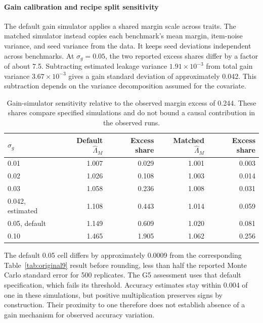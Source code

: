 \paragraph{Gain calibration and recipe split sensitivity}
The default gain simulator applies a shared margin scale across traits. The matched simulator instead copies each benchmark's mean margin, item-noise variance, and seed variance from the data. It keeps seed deviations independent across benchmarks. At $\sigma_g=0.05$, the two reported excess shares differ by a factor of about 7.5. Subtracting estimated leakage variance $1.91\times10^{-3}$ from total gain variance $3.67\times10^{-3}$ gives a gain standard deviation of approximately 0.042. This subtraction depends on the variance decomposition assumed for the covariate.

\begin{table}[!htb]
\centering
\caption{Gain-simulator sensitivity relative to the observed margin excess of 0.244. These shares compare specified simulations and do not bound a causal contribution in the observed runs.}
\label{tab:original13}
\small\setlength{\tabcolsep}{4pt}\renewcommand{\arraystretch}{1.12}
\begin{tabular}{lrrrr}\toprule
$\sigma_g$ & Default $\widehat\Lambda_M$ & Excess share & Matched $\widehat\Lambda_M$ & Excess share\\\midrule
0.01 & 1.007 & 0.029 & 1.001 & 0.003\\
0.02 & 1.026 & 0.108 & 1.003 & 0.014\\
0.03 & 1.058 & 0.236 & 1.008 & 0.031\\
0.042, estimated & 1.108 & 0.443 & 1.014 & 0.059\\
0.05, default & 1.149 & 0.609 & 1.020 & 0.081\\
0.10 & 1.465 & 1.905 & 1.062 & 0.256\\\bottomrule
\end{tabular}
\end{table}

The default 0.05 cell differs by approximately 0.0009 from the corresponding Table~\ref{tab:original9} result before rounding, less than half the reported Monte Carlo standard error for 500 replicates. The G5 assessment uses that default specification, which fails its threshold. Accuracy estimates stay within 0.004 of one in these simulations, but positive multiplication preserves signs by construction. Their proximity to one therefore does not establish absence of a gain mechanism for observed accuracy variation.

